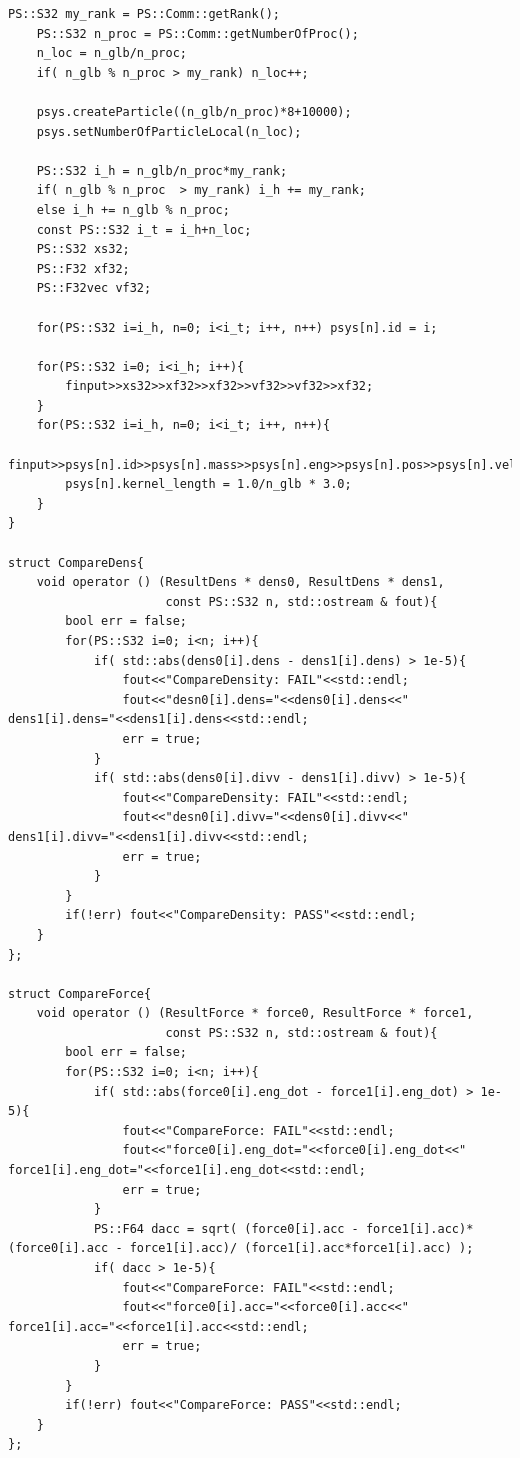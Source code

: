 \begin{lstlisting}[caption=SPHサンプル使用]
    PS::S32 my_rank = PS::Comm::getRank();
    PS::S32 n_proc = PS::Comm::getNumberOfProc();
    n_loc = n_glb/n_proc; 
    if( n_glb % n_proc > my_rank) n_loc++;

    psys.createParticle((n_glb/n_proc)*8+10000);
    psys.setNumberOfParticleLocal(n_loc);

    PS::S32 i_h = n_glb/n_proc*my_rank;
    if( n_glb % n_proc  > my_rank) i_h += my_rank;
    else i_h += n_glb % n_proc;
    const PS::S32 i_t = i_h+n_loc;
    PS::S32 xs32;
    PS::F32 xf32;
    PS::F32vec vf32;

    for(PS::S32 i=i_h, n=0; i<i_t; i++, n++) psys[n].id = i;

    for(PS::S32 i=0; i<i_h; i++){
        finput>>xs32>>xf32>>xf32>>vf32>>vf32>>xf32;
    }
    for(PS::S32 i=i_h, n=0; i<i_t; i++, n++){
        finput>>psys[n].id>>psys[n].mass>>psys[n].eng>>psys[n].pos>>psys[n].vel>>psys[n].kernel_length;
        psys[n].kernel_length = 1.0/n_glb * 3.0;
    }
}

struct CompareDens{
    void operator () (ResultDens * dens0, ResultDens * dens1, 
                      const PS::S32 n, std::ostream & fout){
        bool err = false;
        for(PS::S32 i=0; i<n; i++){
            if( std::abs(dens0[i].dens - dens1[i].dens) > 1e-5){
                fout<<"CompareDensity: FAIL"<<std::endl;
                fout<<"desn0[i].dens="<<dens0[i].dens<<" dens1[i].dens="<<dens1[i].dens<<std::endl;
                err = true;
            }
            if( std::abs(dens0[i].divv - dens1[i].divv) > 1e-5){
                fout<<"CompareDensity: FAIL"<<std::endl;
                fout<<"desn0[i].divv="<<dens0[i].divv<<" dens1[i].divv="<<dens1[i].divv<<std::endl;
                err = true;
            }
        }
        if(!err) fout<<"CompareDensity: PASS"<<std::endl;
    }
};

struct CompareForce{
    void operator () (ResultForce * force0, ResultForce * force1, 
                      const PS::S32 n, std::ostream & fout){
        bool err = false;
        for(PS::S32 i=0; i<n; i++){
            if( std::abs(force0[i].eng_dot - force1[i].eng_dot) > 1e-5){
                fout<<"CompareForce: FAIL"<<std::endl;
                fout<<"force0[i].eng_dot="<<force0[i].eng_dot<<" force1[i].eng_dot="<<force1[i].eng_dot<<std::endl;
                err = true;
            }
            PS::F64 dacc = sqrt( (force0[i].acc - force1[i].acc)*(force0[i].acc - force1[i].acc)/ (force1[i].acc*force1[i].acc) );
            if( dacc > 1e-5){
                fout<<"CompareForce: FAIL"<<std::endl;
                fout<<"force0[i].acc="<<force0[i].acc<<" force1[i].acc="<<force1[i].acc<<std::endl;
                err = true;
            }
        }
        if(!err) fout<<"CompareForce: PASS"<<std::endl;
    }
};



\end{lstlisting}

